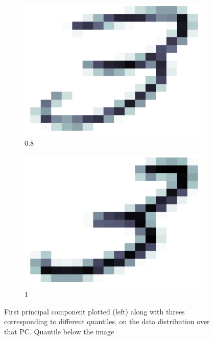 \documentclass[a4paper, 10pt]{article}
\begin{document}
\begin{figure}[h]
\begin{subfigure}[t]{0.16\linewidth}
      \includegraphics[width=1\linewidth]{./lab3/PCA/PC_interpret/PC1_08.png}
      \caption{0.8}
      \label{fig:quant08}
    \end{subfigure}
    \begin{subfigure}[t]{0.16\linewidth}
      \includegraphics[width=1\linewidth]{./lab3/PCA/PC_interpret/PC1_1.png}
      \caption{1}
      \label{fig:quant1}
    \end{subfigure}
    \caption{First principal component plotted (left) along with threes corresponding
    to different quantiles, on the data distribution over that PC. Quantile below
  the image}
    \label{fig:quantiles}
  \end{figure}
\end{document}
